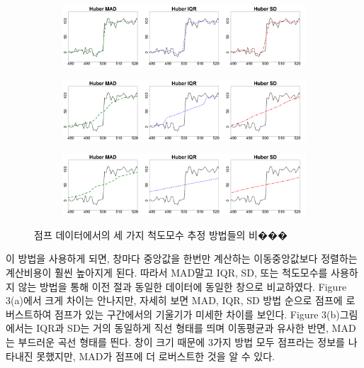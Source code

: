 \documentclass[letterpaper,12pt]{article}
\begin{document}
{\begin{figure}[H]
    \centering
    \begin{subfigure}[b]{\linewidth}
        \centering
        \includegraphics[width=\linewidth]{figures/3scale5.png}
        \caption{}
    \end{subfigure}
    
    \vspace{1em}
    
    \begin{subfigure}[b]{\linewidth}
        \centering
        \includegraphics[width=\linewidth]{figures/3scale51.png}
        \caption{}
    \end{subfigure}
        
    \vspace{1em}
    
    \begin{subfigure}[b]{\linewidth}
        \centering
        \includegraphics[width=\linewidth]{figures/3scale101.png}
        \caption{}
    \end{subfigure}
    
    \caption{점프 데이터에서의 세 가지 척도모수 추정 방법들의 비���}
    \label{fig:comparison}
\end{figure}
이 방법을 사용하게 되면, 창마다 중앙값을 한번만 계산하는 이동중앙값보다 정렬하는 계산비용이 훨씬 높아지게 된다. 따라서 MAD말고 IQR, SD, 또는 척도모수를 사용하지 않는 방법을 통해 이전 절과 동일한 데이터에 동일한 창으로 비교하였다.
Figure 3(a)에서 크게 차이는 안나지만, 자세히 보면 MAD, IQR, SD 방법 순으로 점프에 로버스트하여 점프가 있는 구간에서의 기울기가 미세한 차이를 보인다. Figure 3(b)그림에서는 IQR과 SD는 거의 동일하게 직선 형태를 띄며 이동평균과 유사한 반면, MAD는 부드러운 곡선 형태를 띈다. 창이 크기 때문에 3가지 방법 모두 점프라는 정보를 나타내진 못했지만, MAD가 점프에 더 로버스트한 것을 알 수 있다.

}
\end{document}
